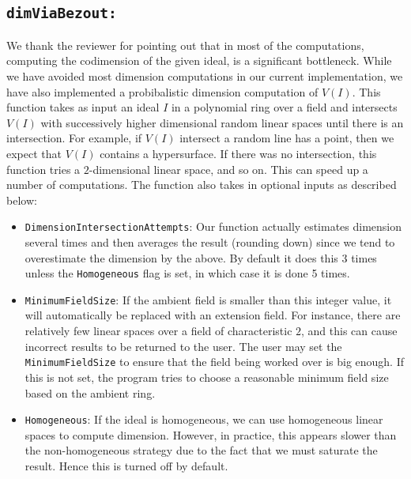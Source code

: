 \documentclass[11pt]{amsart}
\theoremstyle{definition}
\begin{document}
\subsection*{\tt dimViaBezout:} We thank the reviewer for pointing out that in most of the computations, computing the codimension of the given ideal, is a significant bottleneck. While we have avoided most dimension computations in our current implementation, we have also implemented a probibalistic dimension computation of $V(I)$.
This function takes as input an ideal $I$ in a polynomial ring over a field and intersects $V(I)$ with successively higher dimensional random linear spaces until there is an intersection.  For example, if $V(I)$ intersect a random line has a point, then we expect that $V(I)$ contains a hypersurface.  If there was no intersection, this function tries a $2$-dimensional linear space, and so on.  This can speed up a number of computations.  The function also takes in optional inputs as described below:

\begin{itemize}
	\item {\tt DimensionIntersectionAttempts}: 
        Our function actually estimates dimension several times and then averages the result (rounding down) since we tend to overestimate the dimension by the above.  By default it does this 3 times unless the {\tt Homogeneous} flag is set, in which case it is done 5 times.
	\item {\tt MinimumFieldSize}:
	If the ambient field is smaller than this integer value, it will automatically be replaced with an extension field.  For instance, there are relatively few linear spaces over a field of characteristic $2$, and this can cause incorrect results to be returned to the user. The user may set the {\tt MinimumFieldSize} to ensure that the field being worked over is big enough.  If this is not set, the program tries to choose a reasonable minimum field size based on the ambient ring.
    \item {\tt Homogeneous}: 
    If the ideal is homogeneous, we can use homogeneous linear spaces to compute dimension.  However, in practice, this appears slower than the non-homogeneous strategy due to the fact that we must saturate the result.  Hence this is turned off by default.
\end{itemize}
\end{document}

